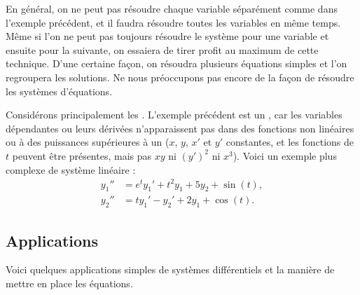 En général, on ne peut pas résoudre chaque variable séparément comme dans l'exemple précédent, et il faudra résoudre toutes les variables en même temps. Même si l'on ne peut pas toujours résoudre le système pour une variable et ensuite pour la suivante, on essaiera de tirer profit au maximum de cette technique. D'une certaine façon, on résoudra plusieurs équations simples et l'on regroupera les solutions. Ne nous préoccupons pas encore de la façon de résoudre les systèmes d'équations.

Considérons principalement les \emph{}. L'exemple précédent est un \emph{}, car les variables dépendantes ou leurs dérivées n'apparaissent pas dans des fonctions non linéaires ou à des puissances supérieures à un ($x$, $y$, $x'$ et $y'$ constantes, et les fonctions de $t$
peuvent être présentes, mais pas $xy$ ni ${(y')}^2$ ni $x^3$). Voici un exemple plus complexe de système linéaire :
\begin{align*}
y_1'' &= e^t y_1' + t^2 y_1 + 5 y_2 + \sin(t), \\
y_2'' &= t y_1'-y_2' + 2 y_1 + \cos(t).
\end{align*}

\subsection{Applications}

Voici quelques applications simples de systèmes différentiels et la manière de mettre en place les équations.

